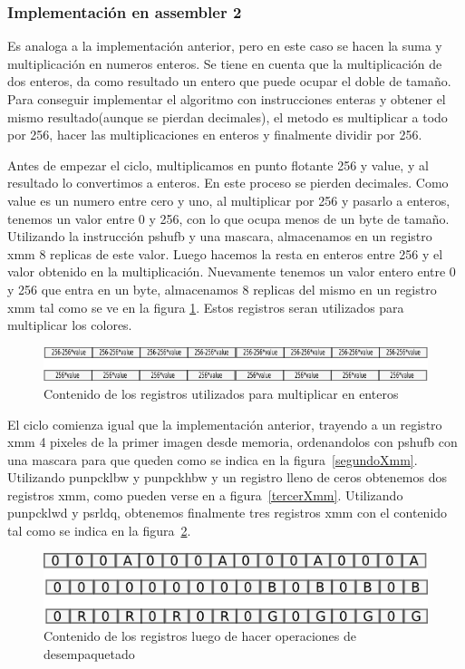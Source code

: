\documentclass[a4paper]{article}
\begin{document}
\subsubsection{Implementación en assembler 2}

Es analoga a la implementación anterior, pero en este caso se hacen la suma y multiplicación en numeros enteros. Se tiene en cuenta que la multiplicación de dos enteros, da como resultado un entero que puede ocupar el doble de tamaño. Para conseguir implementar el algoritmo con instrucciones enteras y obtener el mismo resultado(aunque se pierdan decimales), el metodo es multiplicar a todo por 256, hacer las multiplicaciones en enteros y finalmente dividir por 256.

Antes de empezar el ciclo, multiplicamos en punto flotante 256 y value, y al resultado lo convertimos a enteros. En este proceso se pierden decimales. Como value es un numero entre cero y uno, al multiplicar por 256 y pasarlo a enteros, tenemos un valor entre 0 y 256, con lo que ocupa menos de un byte de tamaño. Utilizando la instrucción pshufb y una mascara, almacenamos en un registro xmm 8 replicas de este valor. Luego hacemos la resta en enteros entre 256 y el valor obtenido en la multiplicación. Nuevamente tenemos un valor entero entre 0 y 256 que entra en un byte, almacenamos 8 replicas del mismo en un registro xmm tal como se ve en la figura \ref{256value}. Estos registros seran utilizados para multiplicar los colores.

\begin{figure}[H]
\centering
\includegraphics[scale=0.8]{imagenes/256value.png}
\caption{Contenido de los registros utilizados para multiplicar en enteros}
\label{256value}
\end{figure}

El ciclo comienza igual que la implementación anterior, trayendo a un registro xmm 4 pixeles de la primer imagen desde memoria, ordenandolos con pshufb con una mascara para que queden como se indica en la figura~\ref{segundoXmm}. Utilizando punpcklbw y punpckhbw y un registro lleno de ceros obtenemos dos registros xmm, como pueden verse en a figura~\ref{tercerXmm}. Utilizando punpcklwd y psrldq, obtenemos finalmente tres registros xmm con el contenido tal como se indica en la figura~\ref{xmmAsm2}.

\begin{figure}[H]
\centering
\includegraphics[scale=0.8]{imagenes/xmmAsm2.png}
\caption{Contenido de los registros luego de hacer operaciones de desempaquetado}
\label{xmmAsm2}
\end{figure}
\end{document}
